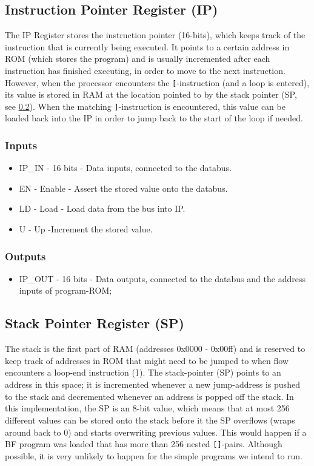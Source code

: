 \subsection{Instruction Pointer Register (IP)} \label{sec:architecture:ip}
The IP Register stores the instruction pointer (16-bits), which keeps track of the instruction that is currently being executed. It points to a certain address in ROM (which stores the program) and is usually incremented after each instruction has finished executing, in order to move to the next instruction. However, when the processor encounters the \texttt{[}-instruction (and a loop is entered), its value is stored in RAM at the location pointed to by the stack pointer (SP, see \ref{sec:architecture:sp}). When the matching \texttt{]}-instruction is encountered, this value can be loaded back into the IP in order to jump back to the start of the loop if needed.

\subsubsection*{Inputs}
\begin{itemize}
\itemsep0em 
\item IP\_IN - 16 bits - Data inputs, connected to the databus.
\item EN - Enable - Assert the stored value onto the databus.
\item LD - Load - Load data from the bus into IP.
\item U - Up -Increment the stored value. 
\end{itemize}

\subsubsection*{Outputs}
\begin{itemize}
\itemsep0em 
\item IP\_OUT - 16 bits - Data outputs, connected to the databus and the address inputs of program-ROM;
\end{itemize}


\subsection{Stack Pointer Register (SP)} \label{sec:architecture:sp}
The stack is the first part of RAM (addresses 0x0000 - 0x00ff) and is reserved to keep track of addresses in ROM that might need to be jumped to when flow encounters a loop-end instruction (\texttt{]}). The stack-pointer (SP) points to an address in this space; it is incremented whenever a new jump-address is pushed to the stack and decremented whenever an address is popped off the stack. In this implementation, the SP is an 8-bit value, which means that at most 256 different values can be stored onto the stack before it the SP overflows (wraps around back to 0) and starts overwriting previous values. This would happen if a BF program was loaded that has more than 256 nested \texttt{[]}-pairs. Although possible, it is very unlikely to happen for the simple programs we intend to run.

